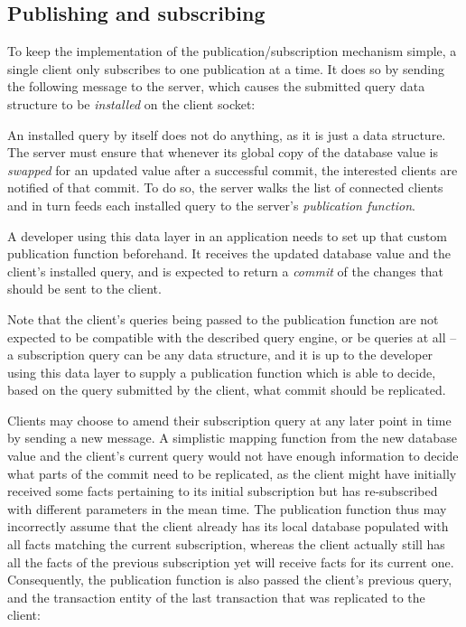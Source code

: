 \cleardoublepage
\subsection{Publishing and subscribing}\label{sec:pubsub_impl}

To keep the implementation of the publication/subscription mechanism simple, a single client only subscribes to one publication at a time. It does so by sending the following message to the server, which causes the submitted query data structure to be \emph{installed} on the client socket:

\begin{center}
\end{center}

An installed query by itself does not do anything, as it is just a data structure. The server must ensure that whenever its global copy of the database value is \emph{swapped} for an updated value after a successful commit, the interested clients are notified of that commit. To do so, the server walks the list of connected clients and in turn feeds each installed query to the server's \emph{publication function}.

A developer using this data layer in an application needs to set up that custom publication function beforehand. It receives the updated database value and the client's installed query, and is expected to return a \emph{commit} of the changes that should be sent to the client.

Note that the client's queries being passed to the publication function are not expected to be compatible with the described query engine, or be queries at all -- a subscription query can be any data structure, and it is up to the developer using this data layer to supply a publication function which is able to decide, based on the query submitted by the client, what commit should be replicated.

Clients may choose to amend their subscription query at any later point in time by sending a new  message. A simplistic mapping function from the new database value and the client's current query would not have enough information to decide what parts of the commit need to be replicated, as the client might have initially received some facts pertaining to its initial subscription but has re-subscribed with different parameters in the mean time. The publication function thus may incorrectly assume that the client already has its local database populated with all facts matching the current subscription, whereas the client actually still has all the facts of the previous subscription yet will receive facts for its current one. Consequently, the publication function is also passed the client's previous query, and the transaction entity of the last transaction that was replicated to the client:

